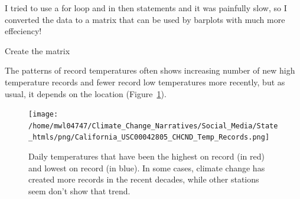 \documentclass{article}
\begin{document}
\begin{itemize}
I tried to use a for loop and in then statements and it was painfully slow, so I converted the data to a matrix that can be used by barplots with much more effeciency!

Create the matrix
\begin{knitrout}
\color{fgcolor}\begin{kframe}


{\ttfamily\noindent\bfseries\color{errorcolor}{\#\# Error in TMAX.mat.noleap[j, year.seq\$Col[year.seq\$Year == i]] <- CHCND.noleap\$TMAX[CHCND.noleap\$Year == : replacement has length zero}}\end{kframe}
\end{knitrout}


\begin{knitrout}
\color{fgcolor}\begin{kframe}


{\ttfamily\noindent\bfseries\color{errorcolor}{\#\# Error in plot.new(): could not open file '/home/mwl04747/Climate\_Change\_Narratives/Social\_Media/State\_htmls/png/California\_USC00042805\_CHCND\_Temp\_Records.png'}}

{\ttfamily\noindent\bfseries\color{errorcolor}{\#\# Error in axis(2, at = ytics, labels = ylabs): plot.new has not been called yet}}

{\ttfamily\noindent\bfseries\color{errorcolor}{\#\# Error in axis(1, at = xtics, labels = xlabs): plot.new has not been called yet}}

{\ttfamily\noindent\bfseries\color{errorcolor}{\#\# Error in rect(y1, x1, y2, x2, ...): plot.new has not been called yet}}

{\ttfamily\noindent\bfseries\color{errorcolor}{\#\# Error in rect(y1, x1, y2, x2, ...): plot.new has not been called yet}}\end{kframe}
\end{knitrout}

The patterns of record temperatures often shows increasing number of new high temperature records  and fewer record low temperatures more recently, but as usual, it depends on the location (Figure~\ref{fig:Records}).
\begin{figure}
\texttt{[image: /home/mwl04747/Climate\_Change\_Narratives/Social\_Media/State\_htmls/png/California\_USC00042805\_CHCND\_Temp\_Records.png]}
\caption{Daily temperatures that have been the highest on record (in red) and lowest on record (in blue). In some cases, climate change has created more records in the recent decades, while other stations seem don't show that trend.}
\label{fig:Records}
\end{figure}


\end{itemize}
\end{document}
